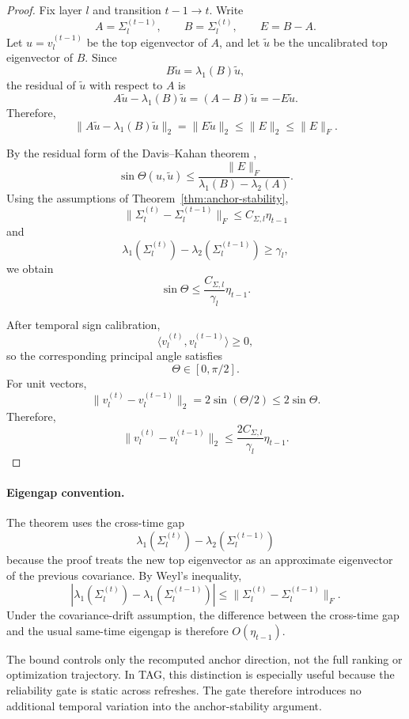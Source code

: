 \begin{proof}
Fix layer \(l\) and transition \(t-1\to t\). Write
\[
A=\Sigma_l^{(t-1)},\qquad
B=\Sigma_l^{(t)},\qquad
E=B-A .
\]
Let \(u=v_l^{(t-1)}\) be the top eigenvector of \(A\), and let
\(\tilde u\) be the uncalibrated top eigenvector of \(B\). Since
\[
B\tilde u=\lambda_1(B)\tilde u,
\]
the residual of \(\tilde u\) with respect to \(A\) is
\[
A\tilde u-\lambda_1(B)\tilde u
=
(A-B)\tilde u
=
-E\tilde u.
\]
Therefore,
\[
\|A\tilde u-\lambda_1(B)\tilde u\|_2
=
\|E\tilde u\|_2
\le
\|E\|_2
\le
\|E\|_F .
\]

By the residual form of the Davis--Kahan theorem
\cite{davis1970rotation,stewart1990matrix},
\[
\sin\Theta(u,\tilde u)
\le
\frac{\|E\|_F}
{\lambda_1(B)-\lambda_2(A)} .
\]
Using the assumptions of Theorem~\ref{thm:anchor-stability},
\[
\|\Sigma_l^{(t)}-\Sigma_l^{(t-1)}\|_F
\le
C_{\Sigma,l}\eta_{t-1}
\]
and
\[
\lambda_1(\Sigma_l^{(t)})
-
\lambda_2(\Sigma_l^{(t-1)})
\ge
\gamma_l,
\]
we obtain
\[
\sin\Theta
\le
\frac{C_{\Sigma,l}}{\gamma_l}\eta_{t-1}.
\]

After temporal sign calibration,
\[
\langle v_l^{(t)},v_l^{(t-1)}\rangle\ge0,
\]
so the corresponding principal angle satisfies
\[
\Theta\in[0,\pi/2].
\]
For unit vectors,
\[
\|v_l^{(t)}-v_l^{(t-1)}\|_2
=
2\sin(\Theta/2)
\le
2\sin\Theta .
\]
Therefore,
\[
\boxed{
\|v_l^{(t)}-v_l^{(t-1)}\|_2
\le
\frac{2C_{\Sigma,l}}{\gamma_l}\eta_{t-1}
}.
\]
\end{proof}


\paragraph{Eigengap convention.}
The theorem uses the cross-time gap
\[
\lambda_1(\Sigma_l^{(t)})
-
\lambda_2(\Sigma_l^{(t-1)})
\]
because the proof treats the new top eigenvector as an approximate
eigenvector of the previous covariance. By Weyl's inequality,
\[
\left|
\lambda_1(\Sigma_l^{(t)})
-
\lambda_1(\Sigma_l^{(t-1)})
\right|
\le
\|\Sigma_l^{(t)}-\Sigma_l^{(t-1)}\|_F .
\]
Under the covariance-drift assumption, the difference between the
cross-time gap and the usual same-time eigengap is therefore
\(O(\eta_{t-1})\).

The bound controls only the recomputed anchor direction, not the full
ranking or optimization trajectory. In TAG, this distinction is
especially useful because the reliability gate is static across
refreshes. The gate therefore introduces no additional temporal
variation into the anchor-stability argument.



